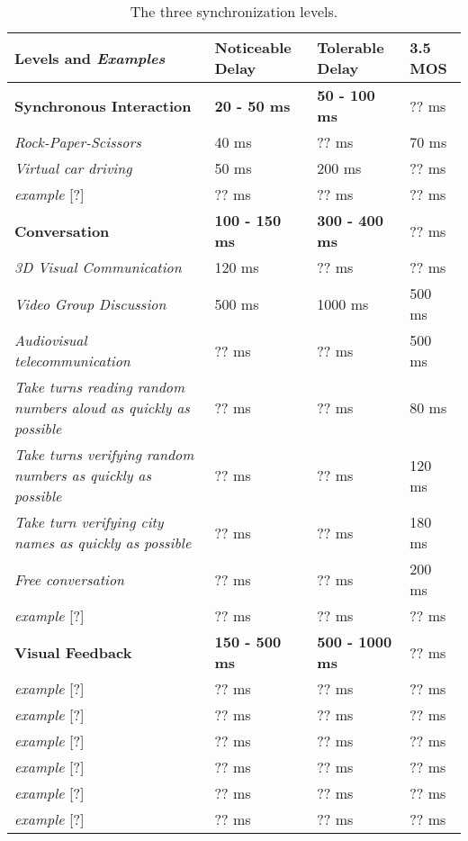 \begin{table} [!htbp]
\newcommand{\tabincell}[2]{\begin{tabular}{@{}#1@{}}#2\end{tabular}}
\begin{tabular}{|p{}|p{}|p{}|p{}|}
\hline 
\textbf{Levels} and \emph{Examples} & Noticeable Delay & Tolerable Delay & 3.5 MOS \\

\hline
\textbf{Synchronous Interaction} & \textbf{20 - 50 ms} & \textbf{50 - 100 ms} & ?? ms \\
\hline
\emph{Rock-Paper-Scissors} \cite{hashimoto2006influences} & 40 ms & ?? ms & 70 ms \\
\hline
\emph{Virtual car driving} \cite{pantel2002impact} & 50 ms & 200 ms & ?? ms \\
\hline
\emph{example} [?] & ?? ms & ?? ms & ?? ms \\

    
\hline
\textbf{Conversation} & \textbf{100 - 150 ms} & \textbf{300 - 400 ms} & ?? ms \\
\hline
\emph{3D Visual Communication} \cite{wu2009quality} & 120 ms & ?? ms & ?? ms \\
\hline
\emph{Video Group Discussion} \cite{schmitt2014asymmetric} & 500 ms & 1000 ms & 500 ms \\
\hline
\emph{Audiovisual telecommunication} \cite{tam2012video} & ?? ms & ?? ms & 500 ms \\
\hline
\emph{Take turns reading random numbers aloud as quickly as possible} \cite{kitawaki1991sub} & ?? ms & ?? ms & 80 ms \\
\hline
\emph{Take turns verifying random numbers as quickly as possible} \cite{kitawaki1991sub} & ?? ms & ?? ms & 120 ms \\
\hline
\emph{Take turn verifying city names as quickly as possible} \cite{kitawaki1991sub} & ?? ms & ?? ms & 180 ms \\
\hline
\emph{Free conversation} \cite{kitawaki1991sub} & ?? ms & ?? ms & 200 ms \\
\hline
\emph{example} [?] & ?? ms & ?? ms & ?? ms \\

\hline
\textbf{Visual Feedback} & \textbf{150 - 500 ms} & \textbf{500 - 1000 ms} & ?? ms \\
\hline
\emph{example} [?] & ?? ms & ?? ms & ?? ms \\
\hline
\emph{example} [?] & ?? ms & ?? ms & ?? ms \\
\hline
\emph{example} [?] & ?? ms & ?? ms & ?? ms \\
\hline
\emph{example} [?] & ?? ms & ?? ms & ?? ms \\
\hline
\emph{example} [?] & ?? ms & ?? ms & ?? ms \\
\hline
\emph{example} [?] & ?? ms & ?? ms & ?? ms \\
\hline

\end{tabular}
\caption{The three synchronization levels.}
\label{tab:table_synchronization_levels}
\end{table}

